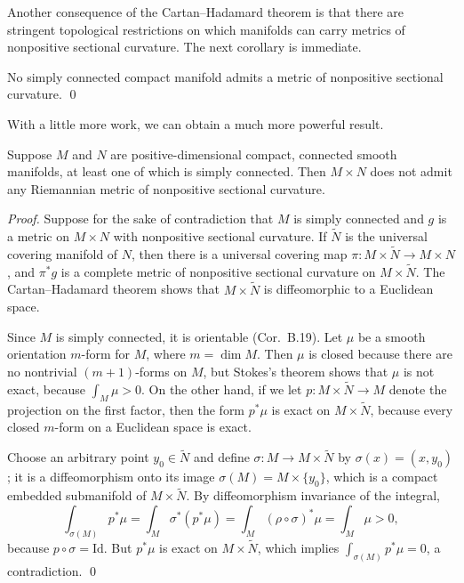 Another consequence of the Cartan--Hadamard theorem is that there are stringent topological restrictions on which manifolds can carry metrics of nonpositive sectional curvature. The next corollary is immediate.

\begin{corollary}
\label{cor:no-simply-connected-compact-nonpositive}
No simply connected compact manifold admits a metric of nonpositive sectional curvature. \qed
\end{corollary}

With a little more work, we can obtain a much more powerful result.

\begin{corollary}
\label{cor:product-manifolds-nonpositive}
Suppose $M$ and $N$ are positive-dimensional compact, connected smooth manifolds, at least one of which is simply connected. Then $M \times N$ does not admit any Riemannian metric of nonpositive sectional curvature.

\textit{Proof.} Suppose for the sake of contradiction that $M$ is simply connected and $g$ is a metric on $M \times N$ with nonpositive sectional curvature. If $\tilde{N}$ is the universal covering manifold of $N$, then there is a universal covering map $\pi : M \times \tilde{N} \to M \times N$, and $\pi^* g$ is a complete metric of nonpositive sectional curvature on $M \times \tilde{N}$. The Cartan--Hadamard theorem shows that $M \times \tilde{N}$ is diffeomorphic to a Euclidean space.

Since $M$ is simply connected, it is orientable (Cor.~B.19). Let $\mu$ be a smooth orientation $m$-form for $M$, where $m = \dim M$. Then $\mu$ is closed because there are no nontrivial $(m+1)$-forms on $M$, but Stokes's theorem shows that $\mu$ is not exact, because $\int_M \mu > 0$. On the other hand, if we let $p : M \times \tilde{N} \to M$ denote the projection on the first factor, then the form $p^* \mu$ is exact on $M \times \tilde{N}$, because every closed $m$-form on a Euclidean space is exact.

Choose an arbitrary point $y_0 \in \tilde{N}$ and define $\sigma : M \to M \times \tilde{N}$ by $\sigma(x) = (x, y_0)$; it is a diffeomorphism onto its image $\sigma(M) = M \times \{y_0\}$, which is a compact embedded submanifold of $M \times \tilde{N}$. By diffeomorphism invariance of the integral,
\[
\int_{\sigma(M)} p^* \mu = \int_M \sigma^*(p^*\mu) = \int_M (\rho \circ \sigma)^*\mu = \int_M \mu > 0,
\]
because $p \circ \sigma = \text{Id}$. But $p^*\mu$ is exact on $M \times \tilde{N}$, which implies $\int_{\sigma(M)} p^*\mu = 0$, a contradiction. \qed
\end{corollary}

